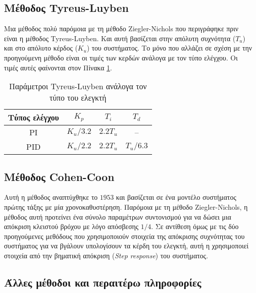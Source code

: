 \subsection{Μέθοδος Tyreus-Luyben}

Μια μέθοδος πολύ παρόμοια με τη μέθοδο Ziegler-Nichols που περιγράφηκε πριν είναι η μέθοδος Tyreus-Luyben. Και αυτή βασίζεται στην απόλυτη συχνότητα (\emph{$T_u$}) και στο απόλυτο κέρδος (\emph{$K_u$}) του συστήματος. Το μόνο που αλλάζει σε σχέση με την προηγούμενη μέθοδο είναι οι τιμές των κερδών ανάλογα με τον τύπο ελέγχου. Οι τιμές αυτές φαίνονται στον Πίνακα \ref{table:tl_method}.

\begin{table}[H]
 \begin{center}
 \begin{tabular}{|c|c|c|c|}
 \hline
 Τύπος ελέγχου & $K_p$ & $T_i$ & $T_d$ \\ \hline
 PI & $K_u/3.2$ & $2.2T_u$ & -- \\ \hline
 PID & $K_u/2.2$ & $2.2T_u$ & $T_u/6.3$ \\ \hline
 \end{tabular}
 \caption{Παράμετροι Tyreus-Luyben ανάλογα τον τύπο του ελεγκτή}
 \label{table:tl_method}
 \end{center}
\end{table}

\subsection{Μέθοδος Cohen-Coon}

Αυτή η μέθοδος αναπτύχθηκε το $1953$ και βασίζεται σε ένα μοντέλο συστήματος πρώτης τάξης με μία χρονοκαθυστέρηση. Παρόμοια με τη μέθοδο Ziegler-Nichols, η μέθοδος αυτή προτείνει ένα σύνολο παραμέτρων συντονισμού για να δώσει μια απόκριση κλειστού βρόχου με λόγο απόσβεσης $1/4$. Σε αντίθεση όμως με τις δύο προηγούμενες μεθόδους που χρησιμοποιούν στοιχεία της απόκρισης συχνότητας του συστήματος για να βγάλουν υπολογίσουν τα κέρδη του ελεγκτή, αυτή η χρησιμοποιεί στοιχεία από την βηματική απόκριση (\emph{Step response}) του συστήματος.

\subsection{Άλλες μέθοδοι και περαιτέρω πληροφορίες}

